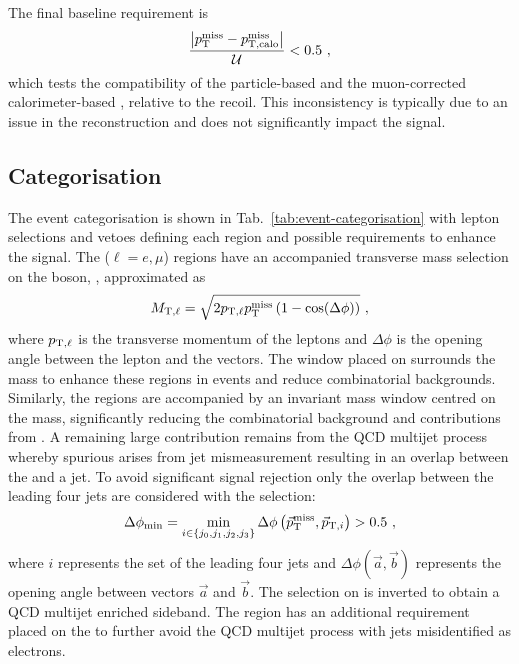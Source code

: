 The final baseline requirement is
%
\begin{equation}
    \frac{\big| p_{\text{T}}^{\mathrm{miss}} - p_{\text{T,calo}}^{\mathrm{miss}} \big|}{\mathcal{U}} < 0.5\ ,
\end{equation}
%
which tests the compatibility of the particle-based \ptmiss and the muon-corrected calorimeter-based \ptmisscalo, relative to the recoil. This inconsistency is typically due to an issue in the reconstruction and does not significantly impact the signal.


\subsection{Categorisation}\label{sec:categorisation}

The event categorisation is shown in Tab.~\ref{tab:event-categorisation} with lepton selections and vetoes defining each region and possible requirements to enhance the signal. The \ellplusjets ($\ell=e,\mu$) regions have an accompanied transverse mass selection on the \PW boson, \mtell, approximated as
%
\begin{equation}
    \mtell = \sqrt{2 \mom_{\mathrm{T},\ell} \ptmiss \left( 1 - \cos(\Delta\phi)\right)}\ ,
\end{equation}
%
where $p_{\mathrm{T},\ell}$ is the transverse momentum of the leptons and $\Delta\phi$ is the opening angle between the lepton and the \vecptmiss vectors. The window placed on \mtell surrounds the \PW mass to enhance these regions in \IWj events and reduce combinatorial backgrounds. Similarly, the \diellplusjets regions are accompanied by an invariant mass \mellell window centred on the \PZ mass, significantly reducing the combinatorial background and contributions from \Igstarj. A remaining large contribution remains from the QCD multijet process whereby spurious \ptmiss arises from jet mismeasurement resulting in an overlap between the \ptmiss and a jet. To avoid significant signal rejection only the overlap between the leading four jets are considered with the selection:
%
\begin{equation}
    \mindphi = \min_{i\in\{j_0,j_1,j_2,j_3\}} \Delta\phi\left(\vecptmiss, \vec{\mom}_{\mathrm{T},i}\right) > 0.5\ ,
\end{equation}
%
where $i$ represents the set of the leading four jets and $\Delta\phi(\vec{a},\vec{b})$ represents the opening angle between vectors $\vec{a}$ and $\vec{b}$. The selection on \mindphi is inverted to obtain a QCD multijet enriched sideband. The \eleplusjets region has an additional requirement placed on the \ptmiss to further avoid the QCD multijet process with jets misidentified as electrons.

